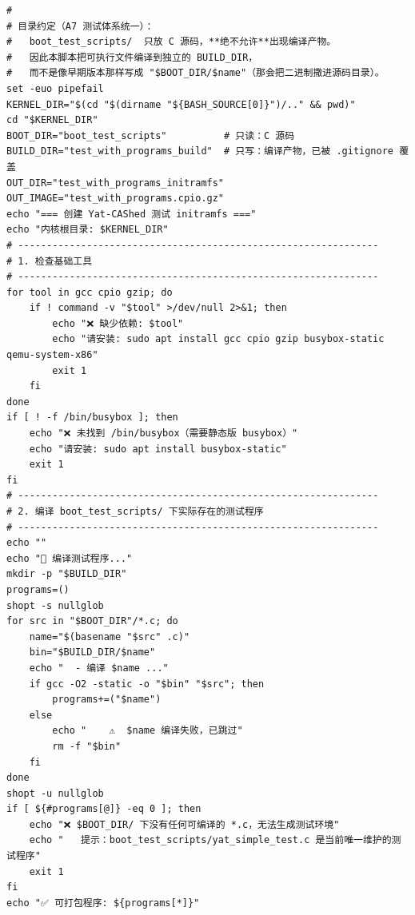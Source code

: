 \documentclass[10pt,a4paper]{article}
\newenvironment{yatpage}{\vspace*{0pt}}{\par}
\begin{document}
\newpage
\begin{yatpage}
\begin{Verbatim}[fontsize=\fontsize{8.2}{9.8}\selectfont]
#
# 目录约定（A7 测试体系统一）：
#   boot_test_scripts/  只放 C 源码，**绝不允许**出现编译产物。
#   因此本脚本把可执行文件编译到独立的 BUILD_DIR，
#   而不是像早期版本那样写成 "$BOOT_DIR/$name"（那会把二进制撒进源码目录）。
set -euo pipefail
KERNEL_DIR="$(cd "$(dirname "${BASH_SOURCE[0]}")/.." && pwd)"
cd "$KERNEL_DIR"
BOOT_DIR="boot_test_scripts"          # 只读：C 源码
BUILD_DIR="test_with_programs_build"  # 只写：编译产物，已被 .gitignore 覆盖
OUT_DIR="test_with_programs_initramfs"
OUT_IMAGE="test_with_programs.cpio.gz"
echo "=== 创建 Yat-CAShed 测试 initramfs ==="
echo "内核根目录: $KERNEL_DIR"
# ---------------------------------------------------------------
# 1. 检查基础工具
# ---------------------------------------------------------------
for tool in gcc cpio gzip; do
    if ! command -v "$tool" >/dev/null 2>&1; then
        echo "❌ 缺少依赖: $tool"
        echo "请安装: sudo apt install gcc cpio gzip busybox-static qemu-system-x86"
        exit 1
    fi
done
if [ ! -f /bin/busybox ]; then
    echo "❌ 未找到 /bin/busybox（需要静态版 busybox）"
    echo "请安装: sudo apt install busybox-static"
    exit 1
fi
# ---------------------------------------------------------------
# 2. 编译 boot_test_scripts/ 下实际存在的测试程序
# ---------------------------------------------------------------
echo ""
echo "🔧 编译测试程序..."
mkdir -p "$BUILD_DIR"
programs=()
shopt -s nullglob
for src in "$BOOT_DIR"/*.c; do
    name="$(basename "$src" .c)"
    bin="$BUILD_DIR/$name"
    echo "  - 编译 $name ..."
    if gcc -O2 -static -o "$bin" "$src"; then
        programs+=("$name")
    else
        echo "    ⚠️  $name 编译失败，已跳过"
        rm -f "$bin"
    fi
done
shopt -u nullglob
if [ ${#programs[@]} -eq 0 ]; then
    echo "❌ $BOOT_DIR/ 下没有任何可编译的 *.c，无法生成测试环境"
    echo "   提示：boot_test_scripts/yat_simple_test.c 是当前唯一维护的测试程序"
    exit 1
fi
echo "✅ 可打包程序: ${programs[*]}"
\end{Verbatim}
\end{yatpage}
\newpage
\end{document}
